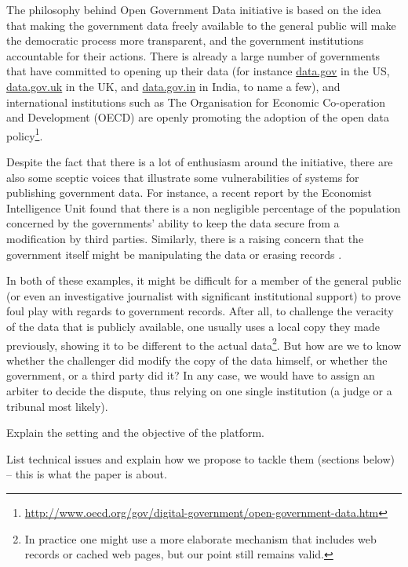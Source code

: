 The philosophy behind Open Government Data initiative is based on the idea that making the government data freely available to the general public will make the democratic process more transparent, and the government institutions accountable for their actions. There is already a large number of governments that have committed to opening up their data (for instance \url{data.gov} in the US, \url{data.gov.uk} in the UK, and \url{data.gov.in} in India, to name a few), and international institutions such as The Organisation for Economic Co-operation and Development (OECD) are openly promoting the adoption of the open data policy\footnote{\url{http://www.oecd.org/gov/digital-government/open-government-data.htm}}.

Despite the fact that there is a lot of enthusiasm around the initiative, there are also some sceptic voices that illustrate some vulnerabilities of  systems for publishing government data. For instance, a recent report by the Economist Intelligence Unit \cite{economist} found that there is a non negligible percentage of the population concerned by the governments' ability to keep the data secure from a modification by third parties. Similarly, there is a raising concern that the government itself might be manipulating the data or erasing records \cite{poynter}. 

In both of these examples, it might be difficult for a member of the general public (or even an investigative journalist with significant institutional support) to prove foul play with regards to government records. After all, to challenge the veracity of the data that is publicly available, one usually uses a local copy they made previously, showing it to be different to the actual data\footnote{In practice one might use a more elaborate mechanism that includes web records or cached web pages, but our point still remains valid.}. But how are we to know whether the challenger did modify the copy of the data himself, or whether the government, or a third party did it? In any case, we would have to assign an arbiter to decide the dispute, thus relying on one single institution (a judge or a tribunal most likely).


Explain the setting and the objective of the platform.

List technical issues and explain how we propose to tackle them (sections below) -- this is what the paper is about.

